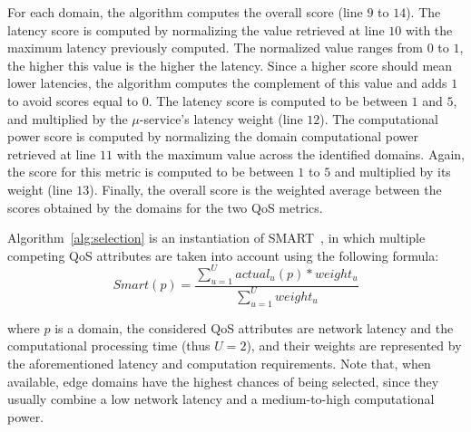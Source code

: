 For each domain, the algorithm computes the overall score (line $9$ to $14$). The latency score is computed by normalizing the value retrieved at line $10$ with the maximum latency previously computed. The normalized value ranges from $0$ to $1$, the higher this value is the higher the latency. Since a higher score should mean lower latencies, the algorithm computes the complement of this value and adds $1$ to avoid scores equal to $0$. The latency score is computed to be between $1$ and $5$, and multiplied by the $\mu$-service's latency weight (line $12$). The computational power score is computed by normalizing the domain computational power retrieved at line $11$ with the maximum value across the identified domains. Again, the score for this metric is computed to be between $1$ to $5$ and multiplied by its weight (line $13$). Finally, the overall score is the weighted average between the scores obtained by the domains for the two QoS metrics.

Algorithm~\ref{alg:selection} is an instantiation of SMART~\cite{Olson1996}, in which multiple competing QoS attributes are taken into account using the following formula:
{\small
\begin{equation}
Smart(p) = \frac{\sum_{u=1}^{U} actual_{u}(p)*weight_u}{\sum_{u=1}^{U}weight_u} \label{eq:smart}
\end{equation}
}%

\noindent
where $p$ is a domain, the considered QoS attributes are network latency and the computational processing time (thus $U = 2$), and their weights are represented by the aforementioned latency and computation requirements. Note that, when available, edge domains have the highest chances of being selected, since they usually combine a low network latency and a medium-to-high computational power. 


